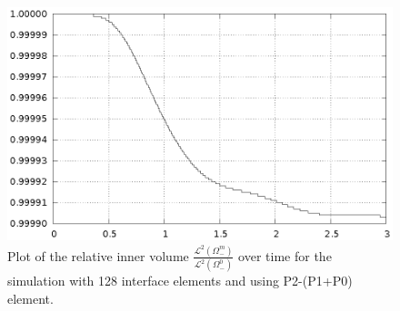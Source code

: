\documentclass[a4paper,12pt,onecolumn]{article}
\begin{document}
\begin{figure}[htbp]
\centering
\includegraphics[width=.45\textwidth]
{figures/2d_benchmark1_inner_volume_p1p0_128.ps}
\caption{Plot of the relative inner volume
$\frac{\mathcal{L}^2(\Omega^m_-)}{\mathcal{L}^2(\Omega^0_-)}$ over time for the
simulation with 128 interface elements and using P2-(P1+P0) element.}
\label{fig:2d_benchmark1_volume}
\end{figure}



\end{document}
